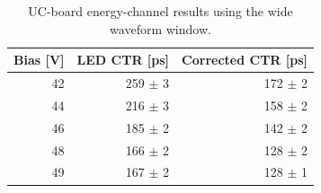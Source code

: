 \begin{table}[htbp]
\centering
\small
\begin{tabular}{rrr}
\toprule
Bias [V] & LED CTR [ps] & Corrected CTR [ps] \\
\midrule
42 & 259 $\pm$ 3 & 172 $\pm$ 2 \\
44 & 216 $\pm$ 3 & 158 $\pm$ 2 \\
46 & 185 $\pm$ 2 & 142 $\pm$ 2 \\
48 & 166 $\pm$ 2 & 128 $\pm$ 2 \\
49 & 167 $\pm$ 2 & 128 $\pm$ 1 \\
\bottomrule
\end{tabular}
\caption{UC-board energy-channel results using the wide waveform window.}
\label{tab:uc-energy-wide}
\end{table}
